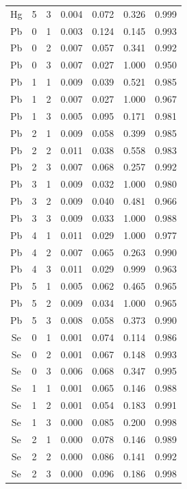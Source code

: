 \documentclass[ms, hidelinks]{uncgdissertationexp3}
\theoremstyle{plain}
\theoremstyle{definition}
\theoremstyle{remark}
\begin{document}
\begin{longtable}{ccccccc}
  Hg & 5 & 3 & 0.004 & 0.072 & 0.326 & 0.999\\
  \rowcolor{gray!6}  Pb & 0 & 1 & 0.003 & 0.124 & 0.145 & 0.993\\
  Pb & 0 & 2 & 0.007 & 0.057 & 0.341 & 0.992\\
  \rowcolor{gray!6}  Pb & 0 & 3 & 0.007 & 0.027 & 1.000 & 0.950\\
  Pb & 1 & 1 & 0.009 & 0.039 & 0.521 & 0.985\\
  \rowcolor{gray!6}  Pb & 1 & 2 & 0.007 & 0.027 & 1.000 & 0.967\\
  Pb & 1 & 3 & 0.005 & 0.095 & 0.171 & 0.981\\
  \rowcolor{gray!6}  Pb & 2 & 1 & 0.009 & 0.058 & 0.399 & 0.985\\
  Pb & 2 & 2 & 0.011 & 0.038 & 0.558 & 0.983\\
  \rowcolor{gray!6}  Pb & 2 & 3 & 0.007 & 0.068 & 0.257 & 0.992\\
  Pb & 3 & 1 & 0.009 & 0.032 & 1.000 & 0.980\\
  \rowcolor{gray!6}  Pb & 3 & 2 & 0.009 & 0.040 & 0.481 & 0.966\\
  Pb & 3 & 3 & 0.009 & 0.033 & 1.000 & 0.988\\
  \rowcolor{gray!6}  Pb & 4 & 1 & 0.011 & 0.029 & 1.000 & 0.977\\
  Pb & 4 & 2 & 0.007 & 0.065 & 0.263 & 0.990\\
  \rowcolor{gray!6}  Pb & 4 & 3 & 0.011 & 0.029 & 0.999 & 0.963\\
  Pb & 5 & 1 & 0.005 & 0.062 & 0.465 & 0.965\\
  \rowcolor{gray!6}  Pb & 5 & 2 & 0.009 & 0.034 & 1.000 & 0.965\\
  Pb & 5 & 3 & 0.008 & 0.058 & 0.373 & 0.990\\
  \rowcolor{gray!6}  Se & 0 & 1 & 0.001 & 0.074 & 0.114 & 0.986\\
  Se & 0 & 2 & 0.001 & 0.067 & 0.148 & 0.993\\
  \rowcolor{gray!6}  Se & 0 & 3 & 0.006 & 0.068 & 0.347 & 0.995\\
  Se & 1 & 1 & 0.001 & 0.065 & 0.146 & 0.988\\
  \rowcolor{gray!6}  Se & 1 & 2 & 0.001 & 0.054 & 0.183 & 0.991\\
  Se & 1 & 3 & 0.000 & 0.085 & 0.200 & 0.998\\
  \rowcolor{gray!6}  Se & 2 & 1 & 0.000 & 0.078 & 0.146 & 0.989\\
  Se & 2 & 2 & 0.000 & 0.086 & 0.141 & 0.992\\
  \rowcolor{gray!6}  Se & 2 & 3 & 0.000 & 0.096 & 0.186 & 0.998\\

\end{longtable}
\end{document}

